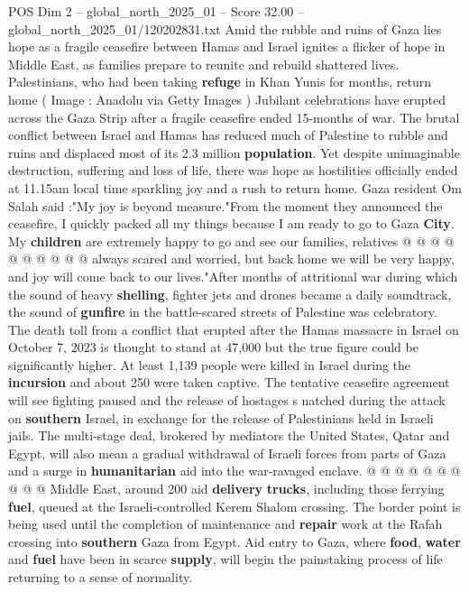 \begin{textsample}{POS Dim 2 – global\_north\_2025\_01 – Score 32.00 – global\_north\_2025\_01/120202831.txt}  \label{ex:f2_pos_361}
Amid the rubble and ruins of Gaza lies hope as a fragile ceasefire between Hamas and Israel ignites a flicker of hope in Middle East, as families prepare to reunite and rebuild shattered lives.
Palestinians, who had been taking \textbf{refuge} in Khan Yunis for months, return home ( Image : Anadolu via Getty Images ) Jubilant celebrations have erupted across the Gaza Strip after a fragile ceasefire ended 15-months of war.
The brutal conflict between Israel and Hamas has reduced much of Palestine to rubble and ruins and displaced most of its 2.3 million \textbf{population}.
Yet despite unimaginable destruction, suffering and loss of life, there was hope as hostilities officially ended at 11.15am local time sparkling joy and a rush to return home.
Gaza resident Om Salah said :"My joy is beyond measure."From the moment they announced the ceasefire, I quickly packed all my things because I am ready to go to Gaza \textbf{City}.
My \textbf{children} are extremely happy to go and see our families, relatives @ @ @ @ @ @ @ @ @ @ always scared and worried, but back home we will be very happy, and joy will come back to our lives."After months of attritional war during which the sound of heavy \textbf{shelling}, fighter jets and drones became a daily soundtrack, the sound of \textbf{gunfire} in the battle-scared streets of Palestine was celebratory.
The death toll from a conflict that erupted after the Hamas massacre in Israel on October 7, 2023 is thought to stand at 47,000 but the true figure could be significantly higher.
At least 1,139 people were killed in Israel during the \textbf{incursion} and about 250 were taken captive.
The tentative ceasefire agreement will see fighting paused and the release of hostages s natched during the attack on \textbf{southern} Israel, in exchange for the release of Palestinians held in Israeli jails.
The multi-stage deal, brokered by mediators the United States, Qatar and Egypt, will also mean a gradual withdrawal of Israeli forces from parts of Gaza and a surge in \textbf{humanitarian} aid into the war-ravaged enclave. @ @ @ @ @ @ @ @ @ @ Middle East, around 200 aid \textbf{delivery} \textbf{trucks}, including those ferrying \textbf{fuel}, queued at the Israeli-controlled Kerem Shalom crossing.
The border point is being used until the completion of maintenance and \textbf{repair} work at the Rafah crossing into \textbf{southern} Gaza from Egypt.
Aid entry to Gaza, where \textbf{food}, \textbf{water} and \textbf{fuel} have been in scarce \textbf{supply}, will begin the painstaking process of life returning to a sense of normality.

\end{textsample}

